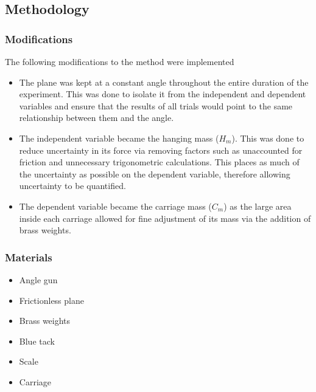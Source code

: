 \documentclass[11pt,a4paper]{article}
\begin{document}
\subsection{Methodology}

\subsubsection{Modifications}


The following modifications to the method were implemented
\begin{itemize}
	\item The plane was kept at a constant angle throughout the entire duration of the experiment. This was done to isolate it from the independent and dependent variables and ensure that the results of all trials would point to the same relationship between them and the angle.
	\item The independent variable became the hanging mass ($H_m$). This was done to reduce uncertainty in its force via removing factors such as unaccounted for friction and unnecessary trigonometric calculations. This places as much of the uncertainty as possible on the dependent variable, therefore allowing uncertainty to be quantified.
	\item The dependent variable became the carriage mass ($C_m$) as the large area inside each carriage allowed for fine adjustment of its mass via the addition of brass weights. 
\end{itemize}

\subsubsection{Materials}
\begin{itemize}
	\item Angle gun 
	\item Frictionless plane
	\item Brass weights
	\item Blue tack 
	\item Scale
	\item Carriage
\end{itemize}
\end{document}

